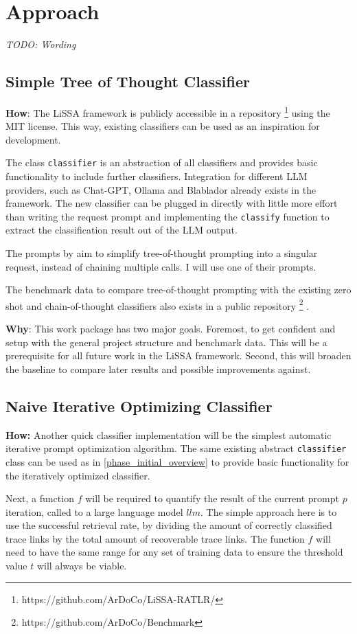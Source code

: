 \chapter{Approach}
\textit{TODO: Wording}
\section{Simple Tree of Thought Classifier}
\textbf{How}: The LiSSA framework is publicly accessible in a repository \footnote{https://github.com/ArDoCo/LiSSA-RATLR/} using the MIT license. This way, existing classifiers can be used as an inspiration for development. 

The class \verb|classifier| is an abstraction of all classifiers and provides basic functionality to include further classifiers. Integration for different LLM providers, such as Chat-GPT, Ollama and Blablador already exists in the framework. The new classifier can be plugged in directly with little more effort than writing the request prompt and implementing the \verb|classify| function to extract the classification result out of the LLM output.

The prompts by  aim to simplify tree-of-thought prompting into a singular request, instead of chaining multiple calls. I will use one of their prompts.

The benchmark data to compare tree-of-thought prompting with the existing zero shot and chain-of-thought classifiers also exists in a public repository \footnote{https://github.com/ArDoCo/Benchmark} \cite{fuchss2022ArDoCoBenchmark}. 


\textbf{Why}: This work package has two major goals. Foremost, to get confident and setup with the general project structure and benchmark data. This will be a prerequisite for all future work in the LiSSA framework. Second, this will broaden the baseline to compare later results and possible improvements against.

\section{Naive Iterative Optimizing Classifier}
\textbf{How:} Another quick classifier implementation will be the simplest automatic iterative prompt optimization algorithm. The same existing abstract \verb|classifier| class can be used as in \ref{phase_initial_overview} to provide basic functionality for the iteratively optimized classifier.

Next, a function $f$ will be required to quantify the result of the current prompt $p$ iteration, called to a large language model $llm$. The simple approach here is to use the successful retrieval rate, by dividing the amount of correctly classified trace links by the total amount of recoverable trace links.
The function $f$ will need to have the same range for any set of training data to ensure the threshold value $t$ will always be viable.



